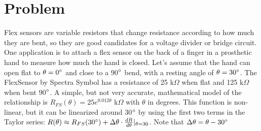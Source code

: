 \documentclass[12pt, a4paper]{article}
\begin{document}
\vspace*{-3mm}
\section*{Problem}
Flex sensors are variable resistors that change resistance according to how much they are
bent, so they are good candidates for a voltage divider or bridge circuit. One application is
to attach a flex sensor on the back of a finger in a prosthetic hand to measure how much the
hand is closed. Let’s assume that the hand can open flat to $\theta = 0 \degree$ and close to a 90$\degree$ bend,
with a resting angle of $\theta = 30 \degree$. The FlexSensor by Spectra Symbol has a resistance of 25 k$\Omega$
when flat and 125 k$\Omega$ when bent 90$\degree$. A simple, but not very accurate, mathematical model
of the relationship is $R_{FS}(\theta) = 25e^{0.012\theta}$ k$\Omega$ with $\theta$ in degrees. This function is non-linear,
but it can be linearized around 30$\degree$ by using the first two terms in the Taylor series: $R(\theta) \approx R_{FS}(30 \degree) + \Delta \theta \cdot \frac{dR}{d\theta} |_{\theta = 30}$. Note that $\Delta \theta = \theta -30 \degree$
\end{document}
